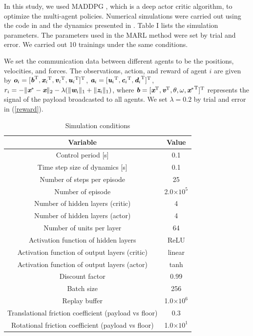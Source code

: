 \documentclass[letterpaper, 10 pt, conference]{ieeeconf} %
\begin{document}
In this study, we used MADDPG \cite{Lowe2017}, which is a deep actor critic algorithm, to optimize the multi-agent policies.
Numerical simulations were carried out using the code in \cite{MADDPGcode} and the dynamics presented in \cite{WangDARS2016}.
Table I lists the simulation parameters.
The parameters used in the MARL method were set by trial and error.
We carried out 10 trainings under the same conditions.

We set the communication data between different agents to be the positions, velocities, and forces.
The observations, action, and reward of agent $i$ are given by $\textit{\textbf{o}}_i=[\textit{\textbf{b}}^{\rm{T}}\it{}, {\textit{\textbf{x}}_i}^{\rm{T}}\it{}, {\textit{\textbf{v}}_i}^{\rm{T}}, {\textit{\textbf{u}}_i}^{\rm{T}}]^{\rm{T}}$, $\textit{\textbf{a}}_i=[{\textit{\textbf{u}}_i}^{\rm{T}},{{\textit{\textbf{c}}_i}}^{\rm{T}},{{\textit{\textbf{d}}_i}}^{\rm{T}} ]^{\rm{T}}$, $r_i=-\| \textit{\textbf{x}}^{\ast}-\textit{\textbf{x}}\|_2-\lambda (\| {\textit{\textbf{w}}_i} \|_1+\| {\textit{\textbf{z}}_i} \|_1)$, where $\textit{\textbf{b}}=[\textit{\textbf{x}}^{\rm{T}}\it{}, \textit{\textbf{v}}^{\rm{T}}\it{}, \theta, \omega, {\textit{\textbf{x}}^{\ast}}^{\rm{T}}\it{}]^{\rm{T}}$ represents the signal of the payload broadcasted to all agents.
We set $\lambda=0.2$ by trial and error in (\ref{reward}).

\begin{table}[!bp]
\caption{Simulation conditions}
\label{sim1_condition}
\centering
\renewcommand{\arraystretch}{1.1}
\vspace{-2mm}
\begin{tabular}{cc}
\hline
Variable & Value \\
\hline
Control period [s] & 0.1 \\
Time step size of dynamics [s] & 0.1 \\
Number of steps per episode & 25 \\
Number of episode & 2.0$\times10^{5}$ \\
Number of hidden layers (critic) & 4 \\
Number of hidden layers (actor) & 4 \\
Number of units per layer & 64 \\
Activation function of hidden layers & ReLU \\
Activation function of output layers (critic) & linear \\
Activation function of output layers (actor) & tanh \\
Discount factor & 0.99 \\
Batch size & 256 \\
Replay buffer & 1.0$\times10^6$ \\
Translational friction coefficient (payload vs floor) & 0.3 \\
Rotational friction coefficient (payload vs floor) & 1.0$\times10^1$ \\
\hline
\end{tabular}
\end{table}
\end{document}
